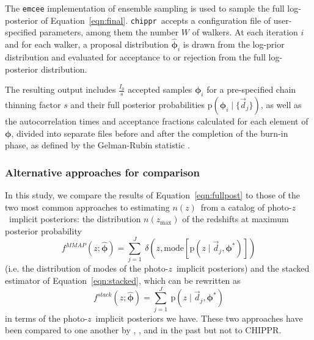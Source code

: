\documentclass[iop]{emulateapj}
\newcommand{\Sect}[1]{Section~\ref{#1}}
\newcommand{\Eq}[1]{Equation~\ref{#1}}
\newcommand{\project}[1]{\textsc{#1}}
\newcommand{\Chippr}{\project{CHIPPR}}%
\newcommand{\repo}[1]{\texttt{#1}}
\newcommand{\chippr}{\repo{chippr}}
\newcommand{\emcee}{\repo{emcee}}
\newcommand{\python}{\textit{Python}}%
\newcommand{\data}{\ensuremath{\vec{d}}}%
\newcommand{\pr}[1]{\ensuremath{\mathrm{p}(#1)}}%
\newcommand{\gvn}{\mid}%
\newcommand{\pz}{photo-$z$}
\newcommand{\pzip}{\pz\ implicit posterior}
\newcommand{\nz}{$n(z)$}
\newcommand{\bvec}[1]{\ensuremath{\boldsymbol{#1}}}%
\newcommand{\ndphi}{\bvec{\phi}}
\begin{document}
The \emcee \citep{foreman-mackey_emcee_2013} implementation of ensemble sampling is used to sample the full log-posterior of \Eq{eqn:final}. 
\chippr\ accepts a configuration file of user-specified parameters, among them the number $W$ of walkers.
At each iteration $i$ and for each walker, a proposal distribution $\hat{\ndphi}_{i}$ is drawn from the log-prior distribution and evaluated for acceptance to or rejection from the full log-posterior distribution.

The resulting output
includes $\frac{I_{0}}{s}$ accepted samples $\ndphi_{i}$ for a pre-specified chain thinning factor $s$ and their full posterior probabilities $\pr{\ndphi_{i} \gvn \{\data_{j}\}}$, as well as the autocorrelation times and acceptance fractions calculated for each element of $\ndphi$, divided into separate files before and after the completion of the burn-in phase, as defined by the Gelman-Rubin statistic \citep{gelman_inference_1992}.  

\subsubsection{Alternative approaches for comparison}
\label{sec:sheldon}

In this study, we compare the results of \Eq{eqn:fullpost} to those of the two most common approaches to estimating \nz\ from a catalog of \pzip s: 
the distribution $n(z_{\mathrm{max}})$ of the redshifts at maximum posterior probability
\begin{equation}
\label{eqn:mmap}
f^{MMAP}(z; \hat{\ndphi}) = \sum_{j=1}^{J}\ \delta(z, \mathrm{mode}[\pr{z \gvn \data_{j}, \ndphi^{*}}])
\end{equation}
(i.e. the distribution of modes of the \pzip s) and the stacked estimator of \Eq{eqn:stacked}, which can be rewritten as 
\begin{equation}
\label{eqn:stacked}
f^{stack}(z; \hat{\ndphi}) = \sum_{j=1}^{J}\ \pr{z \gvn \data_{j}, \ndphi^{*}}
\end{equation}
in terms of the \pzip s we have.
These two approaches have been compared to one another by \citet{hildebrandt_cfhtlens:_2012}, \citet{benjamin_cfhtlens_2013}, and \citet{asorey_galaxy_2016} in the past but not to \Chippr.
\end{document}
